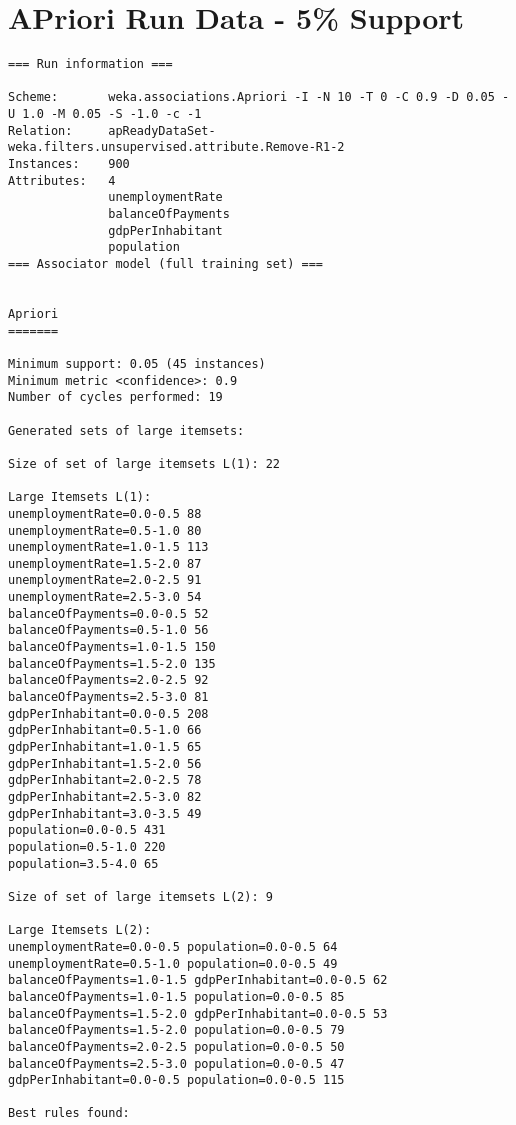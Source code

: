 \section{APriori Run Data - 5\% Support}
\begin{lstlisting}[basicstyle=\footnotesize\ttfamily,numbers=none]
=== Run information ===

Scheme:       weka.associations.Apriori -I -N 10 -T 0 -C 0.9 -D 0.05 -U 1.0 -M 0.05 -S -1.0 -c -1
Relation:     apReadyDataSet-weka.filters.unsupervised.attribute.Remove-R1-2
Instances:    900
Attributes:   4
              unemploymentRate
              balanceOfPayments
              gdpPerInhabitant
              population
=== Associator model (full training set) ===


Apriori
=======

Minimum support: 0.05 (45 instances)
Minimum metric <confidence>: 0.9
Number of cycles performed: 19

Generated sets of large itemsets:

Size of set of large itemsets L(1): 22

Large Itemsets L(1):
unemploymentRate=0.0-0.5 88
unemploymentRate=0.5-1.0 80
unemploymentRate=1.0-1.5 113
unemploymentRate=1.5-2.0 87
unemploymentRate=2.0-2.5 91
unemploymentRate=2.5-3.0 54
balanceOfPayments=0.0-0.5 52
balanceOfPayments=0.5-1.0 56
balanceOfPayments=1.0-1.5 150
balanceOfPayments=1.5-2.0 135
balanceOfPayments=2.0-2.5 92
balanceOfPayments=2.5-3.0 81
gdpPerInhabitant=0.0-0.5 208
gdpPerInhabitant=0.5-1.0 66
gdpPerInhabitant=1.0-1.5 65
gdpPerInhabitant=1.5-2.0 56
gdpPerInhabitant=2.0-2.5 78
gdpPerInhabitant=2.5-3.0 82
gdpPerInhabitant=3.0-3.5 49
population=0.0-0.5 431
population=0.5-1.0 220
population=3.5-4.0 65

Size of set of large itemsets L(2): 9

Large Itemsets L(2):
unemploymentRate=0.0-0.5 population=0.0-0.5 64
unemploymentRate=0.5-1.0 population=0.0-0.5 49
balanceOfPayments=1.0-1.5 gdpPerInhabitant=0.0-0.5 62
balanceOfPayments=1.0-1.5 population=0.0-0.5 85
balanceOfPayments=1.5-2.0 gdpPerInhabitant=0.0-0.5 53
balanceOfPayments=1.5-2.0 population=0.0-0.5 79
balanceOfPayments=2.0-2.5 population=0.0-0.5 50
balanceOfPayments=2.5-3.0 population=0.0-0.5 47
gdpPerInhabitant=0.0-0.5 population=0.0-0.5 115

Best rules found:
\end{lstlisting}

